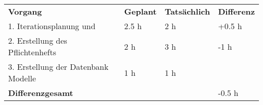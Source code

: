 \begin{tabu}{llll}
\rowfont{\bfseries\leavevmode\color{headingfont}}\textbf{Vorgang} & \textbf{Geplant} & \textbf{Tatsächlich} & \textbf{Differenz} \\
1. Iterationsplanung und & 2.5 h & 2 h & +0.5 h\\ 
2. Erstellung des Pflichtenhefts & 2 h & 3 h & -1 h \\
3. Erstellung der Datenbank Modelle & 1 h & 1 h & \\
\hline
\hline
{}\textbf{Differenzgesamt} & & & -0.5 h \\
\end{tabu}
